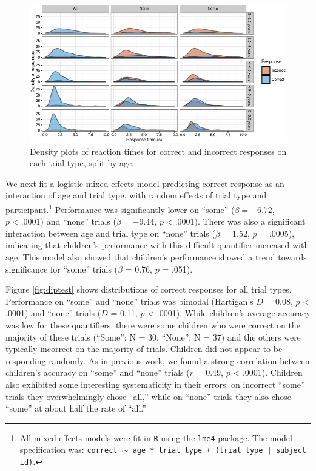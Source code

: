 \documentclass[10pt, letterpaper]{article}
\newenvironment{CodeChunk}{}{}
\begin{document}
\begin{CodeChunk}
\begin{figure}[t]

{\centering \includegraphics{figs/dense-1} 

}

\caption[Density plots of reaction times for correct and incorrect responses on each trial type, split by age]{Density plots of reaction times for correct and incorrect responses on each trial type, split by age.}\label{fig:dense}
\end{figure}
\end{CodeChunk}

We next fit a logistic mixed effects model predicting correct response
as an interaction of age and trial type, with random effects of trial
type and
participant.\footnote{All mixed effects models were fit in \texttt{R} using the \texttt{lme4} package. The model specification was: \texttt{correct $\sim$ age * trial type + (trial type | subject id)}.}
Performance was significantly lower on ``some'' (\(\beta = -6.72\),
\(p < .0001\)) and ``none'' trials (\(\beta = -9.44\), \(p < .0001\)).
There was also a significant interaction between age and trial type on
``none'' trials (\(\beta\) = 1.52, \(p\) = .0005), indicating that
children's performance with this difficult quantifier increased with
age. This model also showed that children's performance showed a trend
towards significance for ``some'' trials (\(\beta\) = 0.76, \(p\) =
.051).

Figure \ref{fig:diptest} shows distributions of correct responses for
all trial types. Performance on ``some'' and ``none'' trials was bimodal
(Hartigan's \(D\) = 0.08, \(p\) \textless{} .0001) and ``none'' trials
(\(D\) = 0.11, \(p\) \textless{} .0001). While children's average
accuracy was low for these quantifiers, there were some children who
were correct on the majority of these trials (``Some'': N = 30;
``None'': N = 37) and the others were typically incorrect on the
majority of trials. Children did not appear to be responding randomly.
As in previous work, we found a strong correlation between children's
accuracy on ``some'' and ``none'' trials (\(r\) = 0.49, \(p\)
\textless{} .0001). Children also exhibited some interesting
systematicity in their errors: on incorrect ``some'' trials they
overwhelmingly chose ``all,'' while on ``none'' trials they also chose
``some'' at about half the rate of ``all.''
\end{document}
